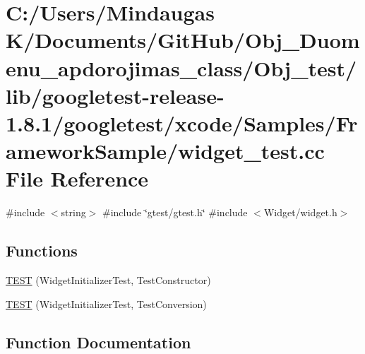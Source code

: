 \hypertarget{_obj__test_2lib_2googletest-release-1_88_81_2googletest_2xcode_2_samples_2_framework_sample_2widget__test_8cc}{}\section{C\+:/\+Users/\+Mindaugas K/\+Documents/\+Git\+Hub/\+Obj\+\_\+\+Duomenu\+\_\+apdorojimas\+\_\+class/\+Obj\+\_\+test/lib/googletest-\/release-\/1.8.1/googletest/xcode/\+Samples/\+Framework\+Sample/widget\+\_\+test.cc File Reference}
\label{_obj__test_2lib_2googletest-release-1_88_81_2googletest_2xcode_2_samples_2_framework_sample_2widget__test_8cc}
{\ttfamily \#include $<$string$>$}\newline
{\ttfamily \#include \char`\"{}gtest/gtest.\+h\char`\"{}}\newline
{\ttfamily \#include $<$Widget/widget.\+h$>$}\newline
\subsection*{Functions}
\begin{DoxyCompactItemize}
\item 
\mbox{\hyperlink{_obj__test_2lib_2googletest-release-1_88_81_2googletest_2xcode_2_samples_2_framework_sample_2widget__test_8cc_a291536a26f617362e0c4b58941eeaead}{T\+E\+ST}} (Widget\+Initializer\+Test, Test\+Constructor)
\item 
\mbox{\hyperlink{_obj__test_2lib_2googletest-release-1_88_81_2googletest_2xcode_2_samples_2_framework_sample_2widget__test_8cc_ab0b72ae0a336fd2a4470c6b5566cd8c0}{T\+E\+ST}} (Widget\+Initializer\+Test, Test\+Conversion)
\end{DoxyCompactItemize}


\subsection{Function Documentation}
\mbox{\label{_obj__test_2lib_2googletest-release-1_88_81_2googletest_2xcode_2_samples_2_framework_sample_2widget__test_8cc_a291536a26f617362e0c4b58941eeaead}} 
